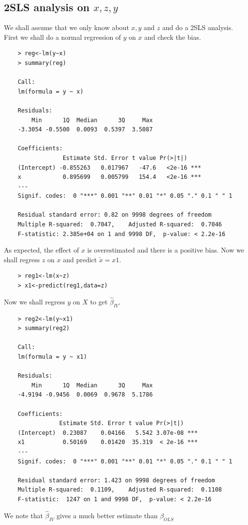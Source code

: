 \documentclass[notoc]{tufte-book}
\begin{document}
\subsection{2SLS analysis on $x,z,y$}
We shall assume that we only know about $x,y$ and $z$ and do a 2SLS analysis. First we shall do a normal regression of $y$ on $x$ and check the bias. 
\begin{lstlisting}
    > reg<-lm(y~x)
    > summary(reg)
    
    Call:
    lm(formula = y ~ x)
    
    Residuals:
        Min      1Q  Median      3Q     Max 
    -3.3054 -0.5500  0.0093  0.5397  3.5087 
    
    Coefficients:
                 Estimate Std. Error t value Pr(>|t|)    
    (Intercept) -0.855263   0.017967   -47.6   <2e-16 ***
    x            0.895699   0.005799   154.4   <2e-16 ***
    ---
    Signif. codes:  0 "***" 0.001 "**" 0.01 "*" 0.05 "." 0.1 " " 1
    
    Residual standard error: 0.82 on 9998 degrees of freedom
    Multiple R-squared:  0.7047,	Adjusted R-squared:  0.7046 
    F-statistic: 2.385e+04 on 1 and 9998 DF,  p-value: < 2.2e-16
\end{lstlisting} 
As expected, the effect of $x$ is overestimated and there is a positive bias. Now we shall regress $z$ on $x$ and predict $\tilde x=x1$.
\begin{lstlisting}
    > reg1<-lm(x~z)
    > x1<-predict(reg1,data=z)
\end{lstlisting}
Now we shall regress $y$ on $X$ to get $\hat\beta_{IV}$.
\begin{lstlisting}
    > reg2<-lm(y~x1)
    > summary(reg2)
    
    Call:
    lm(formula = y ~ x1)
    
    Residuals:
        Min      1Q  Median      3Q     Max 
    -4.9194 -0.9456  0.0069  0.9678  5.1786 
    
    Coefficients:
                Estimate Std. Error t value Pr(>|t|)    
    (Intercept)  0.23087    0.04166   5.542 3.07e-08 ***
    x1           0.50169    0.01420  35.319  < 2e-16 ***
    ---
    Signif. codes:  0 "***" 0.001 "**" 0.01 "*" 0.05 "." 0.1 " " 1
    
    Residual standard error: 1.423 on 9998 degrees of freedom
    Multiple R-squared:  0.1109,	Adjusted R-squared:  0.1108 
    F-statistic:  1247 on 1 and 9998 DF,  p-value: < 2.2e-16
\end{lstlisting}
We note that $\hat\beta_{IV}$ gives a much better estimate than $\beta_{OLS}$
\end{document}
